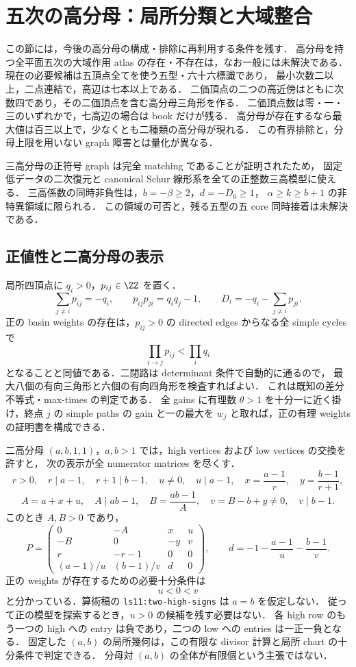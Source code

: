 \section{五次の高分母：局所分類と大域整合}
\label{nt19:denominators}

この節には，今後の高分母の構成・排除に再利用する条件を残す．
高分母を持つ全平面五次の大域作用 atlas の存在・不存在は，なお一般には未解決である．
現在の必要候補は五頂点全てを使う五型・六十六標識であり，
最小次数二以上，二点連結で，高辺は七本以上である．
二価頂点の二つの高近傍はともに次数四であり，その二価頂点を含む高分母三角形を作る．
二価頂点数は零・一・三のいずれかで，七高辺の場合は book だけが残る．
高分母が存在するなら最大値は百三以上で，少なくとも二種類の高分母が現れる．
この有界排除と，分母上限を用いない graph 障害とは量化が異なる．

三高分母の正符号 graph は完全 matching であることが証明されたため，
固定低データの二次復元と canonical Schur 線形系を全ての正整数三高模型に使える．
三高係数の同時非負性は，$b=-\beta\ge2$，$d=-D_0\ge1$，
$\alpha\ge k\ge b+1$ の非特異領域に限られる．
この領域の可否と，残る五型の五 core 同時接着は未解決である．

\subsection{正値性と二高分母の表示}

局所四頂点に $q_i>0$，$p_{ij}\in\ZZ$ を置く．
\[
 \sum_{j\ne i}p_{ij}=-q_i,\qquad
 p_{ij}p_{ji}=q_iq_j-1,\qquad
 D_i=-q_i-\sum_{j\ne i}p_{ji}.
\]
正の basin weights の存在は，$p_{ij}>0$ の directed edges からなる全 simple cycles で
\[
 \prod_{i\to j}p_{ij}<\prod_iq_i
\]
となることと同値である．二閉路は determinant 条件で自動的に通るので，
最大八個の有向三角形と六個の有向四角形を検査すればよい．
これは既知の差分不等式・max-times の判定\cite[\S2]{SergeevSchneiderButkovic}である．
全 gains に有理数 $\theta>1$ を十分一に近く掛け，終点 $j$ の simple paths の gain と一の最大を
$w_j$ と取れば，正の有理 weights の証明書を構成できる．

二高分母 $(a,b,1,1)$，$a,b>1$ では，high vertices および low vertices の交換を許すと，
次の表示が全 numerator matrices を尽くす．
\[
 r>0,\quad r\mid a-1,\quad r+1\mid b-1,\quad
 u\ne0,\quad u\mid a-1,\quad
 x=\frac{a-1}{r},\quad y=\frac{b-1}{r+1},
\]
\[
 A=a+x+u,\quad A\mid ab-1,\quad
 B=\frac{ab-1}{A},\quad v=B-b+y\ne0,\quad v\mid b-1.
\]
このとき $A,B>0$ であり，
\[
 P=\begin{pmatrix}
 0&-A&x&u\\
 -B&0&-y&v\\
 r&-r-1&0&0\\
 (a-1)/u&(b-1)/v&d&0
 \end{pmatrix},\qquad
 d=-1-\frac{a-1}{u}-\frac{b-1}{v}.
\]
正の weights が存在するための必要十分条件は
\[
 u<0<v
\]
と分かっている．算術稿の \texttt{ls11:two-high-signs} は $a=b$ を仮定しない．
従って正の模型を探索するとき，$u>0$ の候補を残す必要はない．
各 high row のもう一つの high への entry は負であり，二つの low への entries は一正一負となる．
固定した $(a,b)$ の局所幾何は，この有限な divisor 計算と局所 chart の十分条件で判定できる．
分母対 $(a,b)$ の全体が有限個という主張ではない．

